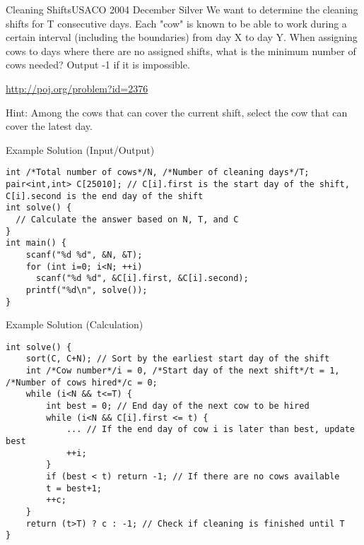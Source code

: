 \begin{pbox}{Cleaning Shifts}{USACO 2004 December Silver}
We want to determine the cleaning shifts for T consecutive days. Each "cow" is known to be able to work during a certain interval (including the boundaries) from day X to day Y. When assigning cows to days where there are no assigned shifts, what is the minimum number of cows needed? Output -1 if it is impossible.

\url{http://poj.org/problem?id=2376}
\end{pbox}

Hint: Among the cows that can cover the current shift, select the cow that can cover the latest day.


Example Solution (Input/Output)
\begin{cbox}
\begin{verbatim}
int /*Total number of cows*/N, /*Number of cleaning days*/T;
pair<int,int> C[25010]; // C[i].first is the start day of the shift, C[i].second is the end day of the shift
int solve() {
  // Calculate the answer based on N, T, and C
}
int main() {
    scanf("%d %d", &N, &T);
    for (int i=0; i<N; ++i)
      scanf("%d %d", &C[i].first, &C[i].second);
    printf("%d\n", solve());
}
\end{verbatim}
\end{cbox}

Example Solution (Calculation)
\begin{cbox}
\begin{verbatim}
int solve() {
    sort(C, C+N); // Sort by the earliest start day of the shift
    int /*Cow number*/i = 0, /*Start day of the next shift*/t = 1, /*Number of cows hired*/c = 0;
    while (i<N && t<=T) {
        int best = 0; // End day of the next cow to be hired
        while (i<N && C[i].first <= t) {
            ... // If the end day of cow i is later than best, update best
            ++i;
        }
        if (best < t) return -1; // If there are no cows available
        t = best+1;
        ++c;
    }
    return (t>T) ? c : -1; // Check if cleaning is finished until T
}
\end{verbatim}
\end{cbox}

